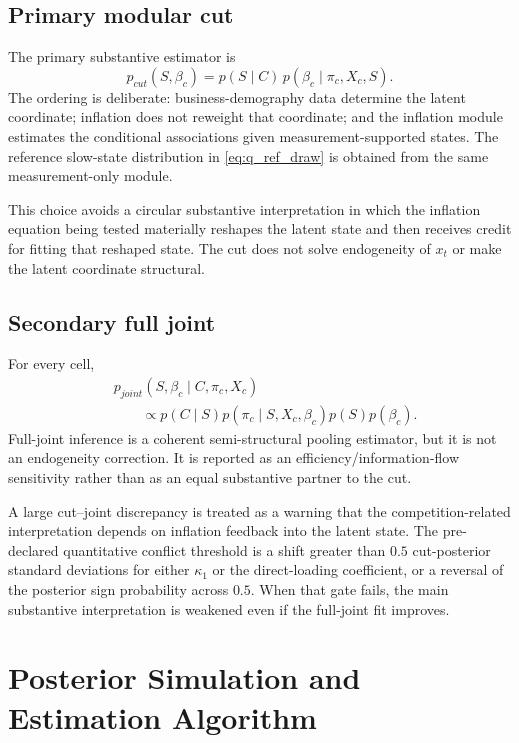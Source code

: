 \documentclass[11pt]{article}
\begin{document}
\subsection{Primary modular cut}

The primary substantive estimator is
\begin{equation}
p_{cut}(S,\beta_c)
=
p(S\mid C)\,p(\beta_c\mid\pi_c,X_c,S).
\label{eq:cut_all_cells}
\end{equation}
The ordering is deliberate: business-demography data determine the latent coordinate; inflation does not reweight that coordinate; and the inflation module estimates the conditional associations given measurement-supported states. The reference slow-state distribution in \cref{eq:q_ref_draw} is obtained from the same measurement-only module.

This choice avoids a circular substantive interpretation in which the inflation equation being tested materially reshapes the latent state and then receives credit for fitting that reshaped state. The cut does not solve endogeneity of $x_t$ or make the latent coordinate structural.

\subsection{Secondary full joint}

For every cell,
\begin{align}
&p_{joint}(S,\beta_c\mid C,\pi_c,X_c)\nonumber\\
&\qquad\propto p(C\mid S)p(\pi_c\mid S,X_c,\beta_c)p(S)p(\beta_c).
\label{eq:full_joint_all_cells}
\end{align}
Full-joint inference is a coherent semi-structural pooling estimator, but it is not an endogeneity correction. It is reported as an efficiency/information-flow sensitivity rather than as an equal substantive partner to the cut.

A large cut--joint discrepancy is treated as a warning that the competition-related interpretation depends on inflation feedback into the latent state. The pre-declared quantitative conflict threshold is a shift greater than $0.5$ cut-posterior standard deviations for either $\kappa_1$ or the direct-loading coefficient, or a reversal of the posterior sign probability across $0.5$. When that gate fails, the main substantive interpretation is weakened even if the full-joint fit improves.

\section{Posterior Simulation and Estimation Algorithm}
\end{document}
